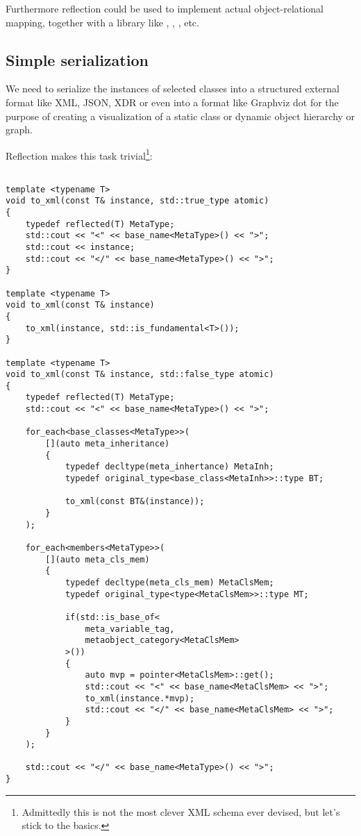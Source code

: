 Furthermore reflection could be used to implement actual object-relational mapping,
together with a library like \verb@SOCI@, \verb@ODBC@, \verb@libpq@, etc.

\subsection{Simple serialization}

We need to serialize the instances of selected classes into a structured external format
like XML, JSON, XDR or even into a format like Graphviz dot for the purpose of creating
a visualization of a static class or dynamic object hierarchy or graph.

Reflection makes this task trivial\footnote{
Admittedly this is not the most clever XML schema ever devised, but let's stick to the basics.}:

\begin{verbatim}

template <typename T>
void to_xml(const T& instance, std::true_type atomic)
{
	typedef reflected(T) MetaType;
	std::cout << "<" << base_name<MetaType>() << ">";
	std::cout << instance;
	std::cout << "</" << base_name<MetaType>() << ">";
}

template <typename T>
void to_xml(const T& instance)
{
	to_xml(instance, std::is_fundamental<T>());
}

template <typename T>
void to_xml(const T& instance, std::false_type atomic)
{
	typedef reflected(T) MetaType;
	std::cout << "<" << base_name<MetaType>() << ">";

	for_each<base_classes<MetaType>>(
		[](auto meta_inheritance)
		{
			typedef decltype(meta_inhertance) MetaInh;
			typedef original_type<base_class<MetaInh>>::type BT;

			to_xml(const BT&(instance));
		}
	);

	for_each<members<MetaType>>(
		[](auto meta_cls_mem)
		{
			typedef decltype(meta_cls_mem) MetaClsMem;
			typedef original_type<type<MetaClsMem>>::type MT;

			if(std::is_base_of<
				meta_variable_tag,
				metaobject_category<MetaClsMem>
			>())
			{
				auto mvp = pointer<MetaClsMem>::get();
				std::cout << "<" << base_name<MetaClsMem> << ">";
				to_xml(instance.*mvp);
				std::cout << "</" << base_name<MetaClsMem> << ">";
			}
		}
	);

	std::cout << "</" << base_name<MetaType>() << ">";
}

\end{verbatim}

